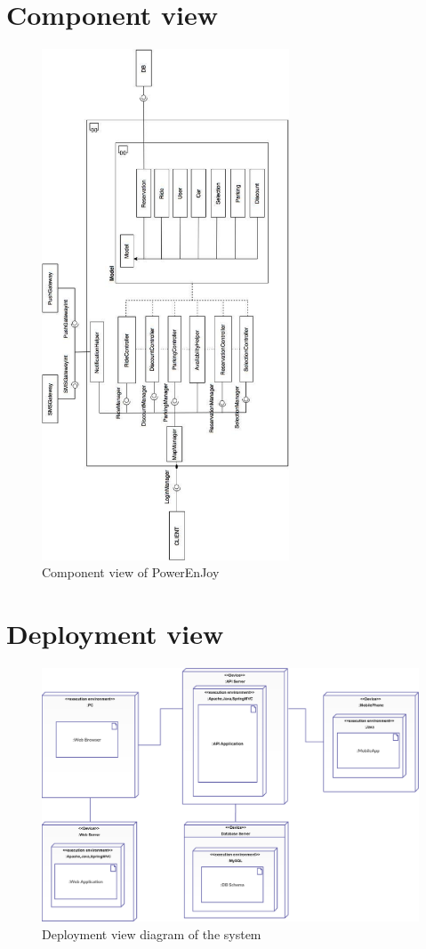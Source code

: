 \newpage
\section{Component view}
\begin{figure}[h]
	\centering
	\includegraphics[height=15.2cm,keepaspectratio]{figures/component_view.eps}
	\caption{Component view of PowerEnJoy}
	\label{fig:component_view}
\end{figure}

\newpage
\section{Deployment view}
\begin{figure}[h]
	\centering
	\includegraphics[width=\linewidth,keepaspectratio]{figures/deployment_view.eps}
	\caption{Deployment view diagram of the system}
	\label{fig:deployment_view}
\end{figure}

